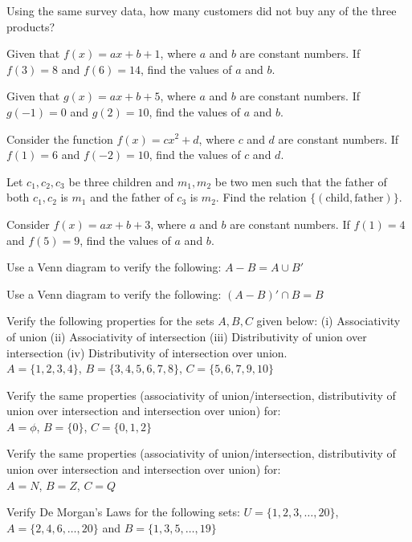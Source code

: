 \documentclass[11pt]{article}
\begin{document}
\begin{wq}[start=56]
\item Using the same survey data, how many customers did not buy any of the three products?

\item Given that $f(x)=ax+b+1$, where $a$ and $b$ are constant numbers. If $f(3)=8$ and $f(6)=14$, find the values of $a$ and $b$.

\item Given that $g(x)=ax+b+5$, where $a$ and $b$ are constant numbers. If $g(-1)=0$ and $g(2)=10$, find the values of $a$ and $b$.

\item Consider the function $f(x)=cx^2+d$, where $c$ and $d$ are constant numbers. If $f(1)=6$ and $f(-2)=10$, find the values of $c$ and $d$.

\item Let $c_1,c_2,c_3$ be three children and $m_1,m_2$ be two men such that the father of both $c_1,c_2$ is $m_1$ and the father of $c_3$ is $m_2$. Find the relation $\{(\text{child},\text{father})\}$.

\item Consider $f(x)=ax+b+3$, where $a$ and $b$ are constant numbers. If $f(1)=4$ and $f(5)=9$, find the values of $a$ and $b$.

\item Use a Venn diagram to verify the following: $A-B = A\cup B'$

\item Use a Venn diagram to verify the following: $(A-B)'\cap B = B$

\item Verify the following properties for the sets $A,B,C$ given below: (i) Associativity of union (ii) Associativity of intersection (iii) Distributivity of union over intersection (iv) Distributivity of intersection over union. \\
$A=\{1,2,3,4\}$, $B=\{3,4,5,6,7,8\}$, $C=\{5,6,7,9,10\}$

\item Verify the same properties (associativity of union/intersection, distributivity of union over intersection and intersection over union) for: \\
$A=\phi$, $B=\{0\}$, $C=\{0,1,2\}$

\item Verify the same properties (associativity of union/intersection, distributivity of union over intersection and intersection over union) for: \\
$A=N$, $B=Z$, $C=Q$

\item Verify De Morgan's Laws for the following sets: $U=\{1,2,3,\ldots,20\}$, $A=\{2,4,6,\ldots,20\}$ and $B=\{1,3,5,\ldots,19\}$

\end{wq}
\end{document}
